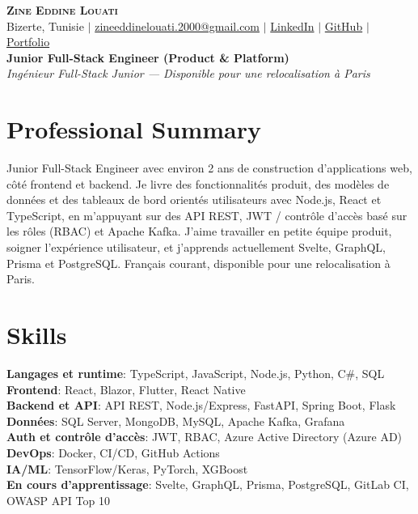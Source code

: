 \documentclass[letterpaper,11pt]{article}
\begin{document}
\begin{center}
    \textbf{\Huge \scshape Zine Eddine Louati} \\ \vspace{2pt}
    \small
    Bizerte, Tunisie $|$
    \href{mailto:zineeddinelouati.2000@gmail.com}{zineeddinelouati.2000@gmail.com} $|$
    \href{https://www.linkedin.com/in/zine-louati/}{LinkedIn} $|$
    \href{https://github.com/louatizine}{GitHub} $|$
    \href{https://zayneddine.me}{Portfolio} \\
    \vspace{1pt}
    \textbf{Junior Full-Stack Engineer (Product \& Platform)}
    \\ \textit{\small Ingénieur Full-Stack Junior --- Disponible pour une relocalisation à Paris}
\end{center}


\section{Professional Summary}
\small{Junior Full-Stack Engineer avec environ 2 ans de construction d'applications web, côté frontend et backend. Je livre des fonctionnalités produit, des modèles de données et des tableaux de bord orientés utilisateurs avec Node.js, React et TypeScript, en m'appuyant sur des API REST, JWT / contrôle d'accès basé sur les rôles (RBAC) et Apache Kafka. J'aime travailler en petite équipe produit, soigner l'expérience utilisateur, et j'apprends actuellement Svelte, GraphQL, Prisma et PostgreSQL. Français courant, disponible pour une relocalisation à Paris.}


\section{Skills}
 \begin{itemize}[leftmargin=0.15in, label={}]
    \small{\item{
     \textbf{Langages et runtime}{: TypeScript, JavaScript, Node.js, Python, C\#, SQL} \\
     \textbf{Frontend}{: React, Blazor, Flutter, React Native} \\
     \textbf{Backend et API}{: API REST, Node.js/Express, FastAPI, Spring Boot, Flask} \\
     \textbf{Données}{: SQL Server, MongoDB, MySQL, Apache Kafka, Grafana} \\
     \textbf{Auth et contrôle d'accès}{: JWT, RBAC, Azure Active Directory (Azure AD)} \\
     \textbf{DevOps}{: Docker, CI/CD, GitHub Actions} \\
     \textbf{IA/ML}{: TensorFlow/Keras, PyTorch, XGBoost} \\
     \textbf{En cours d'apprentissage}{: Svelte, GraphQL, Prisma, PostgreSQL, GitLab CI, OWASP API Top 10}
    }}
 \end{itemize}
\end{document}
